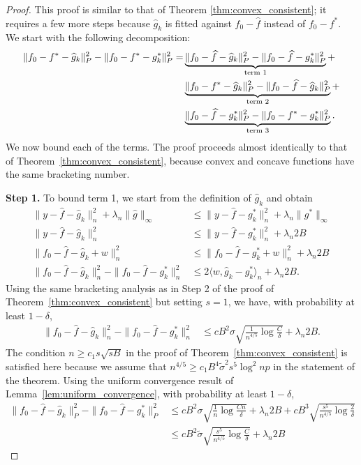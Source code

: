 \begin{proof}
This proof is similar to that of Theorem \ref{thm:convex_consistent}; it requires a few more steps because $\hat{g}_k$ is fitted against $f_0 - \hat{f}$ instead of $f_0 - f^*$. We start with the following decomposition:
\begin{align}
\| f_0 - f^* - \widehat{g}_k \|_P^2 - \| f_0 - f^* - g^*_k \|_P^2 = & \underbrace{\| f_0 - \widehat{f} - \widehat{g}_k \|_P^2 - \| f_0 - \widehat{f} - g^*_k \|_P^2}_{\textrm{term 1}} + \nonumber \\
   & \underbrace{\| f_0 - f^* - \widehat{g}_k \|_P^2 - \| f_0 - \widehat{f} - \widehat{g}_k \|_P^2}_{\textrm{term 2}} + \nonumber \\
   & \underbrace{\| f_0 - \widehat{f} - g^*_k \|_P^2 - \| f_0 - f^* - g^*_k \|_P^2}_{\textrm{term 3}}  \label{eqn:concave_init_decomposition}.
\end{align}
We now bound each of the terms. The proof proceeds almost identically to that of Theorem~\ref{thm:convex_consistent}, because convex and concave functions have the same bracketing number.

\textbf{Step 1.} To bound term 1, we start from the definition of
$\hat{g}_k$ and obtain
\begin{align*}
\| y - \hat{f} - \hat{g}_k \|_n^2 + \lambda_n \| \hat{g} \|_\infty &\leq
   \| y - \hat{f} - g^*_k \|_n^2 + \lambda_n \| g^* \|_\infty \\
\| y - \hat{f} - \hat{g}_k \|_n^2 &\leq \| y - \hat{f} - g^*_k \|_n^2 + \lambda_n 2B \\[10pt]
\| f_0 - \hat{f} - \hat{g}_k + w\|_n^2 & \leq \| f_0 - \hat{f} - g^*_k + w \|_n^2 
   +\lambda_n 2 B \\
\| f_0 - \hat{f} - \hat{g}_k \|_n^2 - \|f_0 -\hat{f} - g^*_k\|_n^2 &\leq
   2 \langle w, \hat{g}_k - g^*_k \rangle_n + \lambda_n 2B.
\end{align*}
Using the same bracketing analysis as in Step 2 of the proof of Theorem~\ref{thm:convex_consistent} but setting $s=1$, we have, with probability at least $1-\delta$,
\begin{align*}
\| f_0 - \hat{f} - \hat{g}_k \|_n^2 - \|f_0 - \hat{f} - g^*_k \|_n^2 &\leq
  c B^2 \sigma \sqrt{ \frac{1}{n^{4/5}} \log \frac{C}{\delta} }+ \lambda_n 2 B.
\end{align*}
The condition $n \geq c_1 s\sqrt{sB}$ in the proof of Theorem~\ref{thm:convex_consistent} is satisfied here because we assume that $n^{4/5} \geq c_1 B^4 \tilde{\sigma}^2 s^5 \log^2 np$ in the statement of the theorem.
Using the uniform convergence result of Lemma~\ref{lem:uniform_convergence}, with probability at least $1-\delta$,
\begin{align*}
\| f_0 - \hat{f} - \hat{g}_k \|_P^2 - \|f_0 - \hat{f} - g^*_k \|_P^2 &\leq
  c B^2 \sigma \sqrt{ \frac{1}{n} \log \frac{Cn}{\delta} }+ \lambda_n 2 B +
  c B^3 \sqrt{\frac{s^5}{n^{4/5}} \log \frac{2}{\delta} } \\
 &\leq c B^2 \tilde{\sigma} \sqrt{\frac{s^5}{n^{4/5}} \log \frac{C}{\delta}}+ \lambda_n 2B
\end{align*}


\end{proof}
